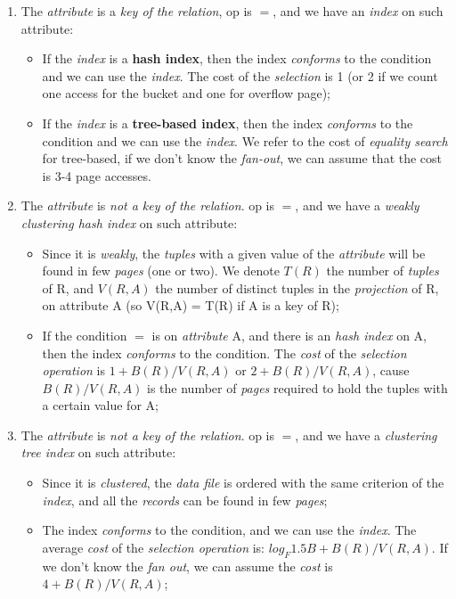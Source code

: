 \documentclass{article}
\begin{document}
\begin{enumerate}
\item The \emph{attribute} is a \emph{key of the relation}, op is $=$, and we have an \emph{index} on such attribute:
\begin{itemize}
\item If the \emph{index} is a \textbf{hash index}, then the index \emph{conforms} to the condition and we can use the \emph{index}. The cost of the \emph{selection} is 1 (or 2 if we count one access for the bucket and one for overflow page);
\item If the \emph{index} is a \textbf{tree-based index}, then the index \emph{conforms} to the condition and we can use the \emph{index}. We refer to the cost of \emph{equality search} for tree-based, if we don't know the \emph{fan-out}, we can assume that the cost is 3-4 page accesses.
\end{itemize}
\item The \emph{attribute} is \emph{not a key of the relation}. op is $=$, and we have a \emph{weakly clustering hash index} on such attribute:
\begin{itemize}
\item Since it is \emph{weakly}, the \emph{tuples} with a given value of the \emph{attribute} will be found in few \emph{pages} (one or two). We denote $T(R)$ the number of \emph{tuples} of R, and $V(R,A)$ the number of distinct tuples in the \emph{projection} of R, on attribute A (so V(R,A) = T(R) if A is a key of R);
\item If the condition $=$ is on \emph{attribute} A, and there is an \emph{hash index} on A, then the index \emph{conforms} to the condition. The \emph{cost} of the \emph{selection operation} is $1+B(R)/V(R,A)$ or $2+B(R)/V(R,A)$, cause $B(R)/V(R,A)$ is the number of \emph{pages} required to hold the tuples with a certain value for A;
\end{itemize}
\item The \emph{attribute} is \emph{not a key of the relation}. op is $=$, and we have a \emph{clustering tree index} on such attribute:
\begin{itemize}
\item Since it is \emph{clustered}, the \emph{data file} is ordered with the same criterion of the \emph{index}, and all the \emph{records} can be found in few \emph{pages};
\item The index \emph{conforms} to the condition, and we can use the \emph{index}. The average \emph{cost} of the \emph{selection operation} is: $log_F 1.5B + B(R)/V(R,A)$. If we don't know the \emph{fan out}, we can assume the \emph{cost} is $4+ B(R)/V(R,A)$;

\end{itemize}
\end{enumerate}
\end{document}
